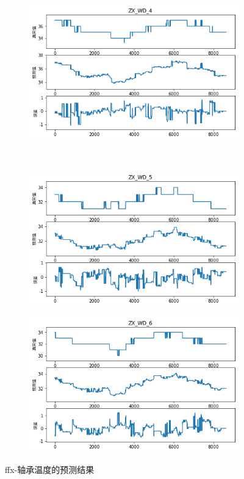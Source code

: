 \begin{figure}[H]
\begin{subfigure}[t]{0.48\textwidth}
\end{subfigure}\hfill
\begin{subfigure}[t]{0.48\textwidth}
    \centering
    \includegraphics[scale=0.45]{figures/sr/ffx-zx_wd_4.png}
\end{subfigure}\\
\begin{subfigure}[t]{0.48\textwidth}
  \centering
  \includegraphics[scale=0.45]{figures/sr/ffx-zx_wd_5.png}
\end{subfigure}\hfill
\begin{subfigure}[t]{0.48\textwidth}
    \centering
    \includegraphics[scale=0.45]{figures/sr/ffx-zx_wd_6.png}
\end{subfigure}
\caption{ffx-轴承温度的预测结果}
\label{fig:ffx_zx_wd}
\end{figure}
